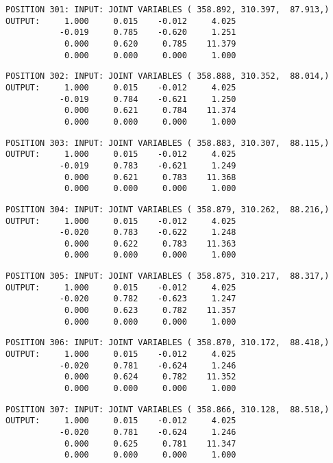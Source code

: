 \begin{verbatim}
POSITION 301: INPUT: JOINT VARIABLES ( 358.892, 310.397,  87.913,)
OUTPUT:     1.000     0.015    -0.012     4.025
           -0.019     0.785    -0.620     1.251
            0.000     0.620     0.785    11.379
            0.000     0.000     0.000     1.000
\end{verbatim} \pagebreak[1]\begin{verbatim}
POSITION 302: INPUT: JOINT VARIABLES ( 358.888, 310.352,  88.014,)
OUTPUT:     1.000     0.015    -0.012     4.025
           -0.019     0.784    -0.621     1.250
            0.000     0.621     0.784    11.374
            0.000     0.000     0.000     1.000
\end{verbatim} \pagebreak[1]\begin{verbatim}
POSITION 303: INPUT: JOINT VARIABLES ( 358.883, 310.307,  88.115,)
OUTPUT:     1.000     0.015    -0.012     4.025
           -0.019     0.783    -0.621     1.249
            0.000     0.621     0.783    11.368
            0.000     0.000     0.000     1.000
\end{verbatim} \pagebreak[1]\begin{verbatim}
POSITION 304: INPUT: JOINT VARIABLES ( 358.879, 310.262,  88.216,)
OUTPUT:     1.000     0.015    -0.012     4.025
           -0.020     0.783    -0.622     1.248
            0.000     0.622     0.783    11.363
            0.000     0.000     0.000     1.000
\end{verbatim} \pagebreak[1]\begin{verbatim}
POSITION 305: INPUT: JOINT VARIABLES ( 358.875, 310.217,  88.317,)
OUTPUT:     1.000     0.015    -0.012     4.025
           -0.020     0.782    -0.623     1.247
            0.000     0.623     0.782    11.357
            0.000     0.000     0.000     1.000
\end{verbatim} \pagebreak[1]\begin{verbatim}
POSITION 306: INPUT: JOINT VARIABLES ( 358.870, 310.172,  88.418,)
OUTPUT:     1.000     0.015    -0.012     4.025
           -0.020     0.781    -0.624     1.246
            0.000     0.624     0.782    11.352
            0.000     0.000     0.000     1.000
\end{verbatim} \pagebreak[1]\begin{verbatim}
POSITION 307: INPUT: JOINT VARIABLES ( 358.866, 310.128,  88.518,)
OUTPUT:     1.000     0.015    -0.012     4.025
           -0.020     0.781    -0.624     1.246
            0.000     0.625     0.781    11.347
            0.000     0.000     0.000     1.000
\end{verbatim} \pagebreak[1]\begin{verbatim}

\end{verbatim}
